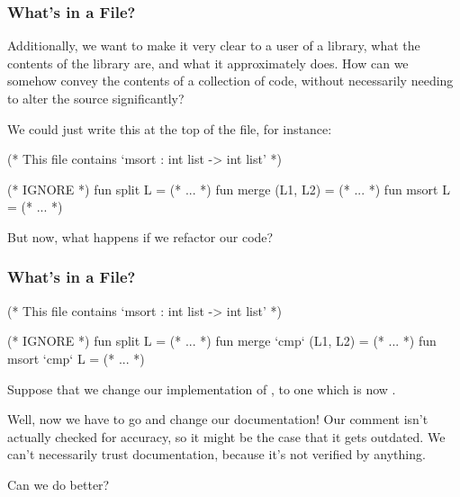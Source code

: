 \documentclass[aspectratio=169]{beamer}
\begin{document}
\begin{frame}[fragile]
  \frametitle{What's in a File?}

  Additionally, we want to make it very clear to a user of a library, what the
  contents of the library are, and what it approximately does. How can we somehow
  convey the contents of a collection of code, without necessarily needing to alter
  the source significantly?

  \pause
  \vspace{\fill}

  We could just write this at the top of the file, for instance:

  \begin{codeblock}
    (* This file contains `msort : int list -> int list' *)

    (* IGNORE *)
    fun split L = (* ... *)
    fun merge (L1, L2) = (* ... *)
    fun msort L = (* ... *)
  \end{codeblock}

  \pause
  But now, what happens if we refactor our code?
\end{frame}

\begin{frame}[fragile]
  \frametitle{What's in a File?}

  \begin{codeblock}
    (* This file contains `msort : int list -> int list' *)

    (* IGNORE *)
    fun split L = (* ... *)
    fun merge `cmp` (L1, L2) = (* ... *)
    fun msort `cmp` L = (* ... *)
  \end{codeblock}

  Suppose that we change our implementation of , to one
  which is now .

  \pause
  \vspace{\fill}

  Well, now we have to go and change our documentation! Our comment
  isn't actually checked for accuracy, so it might be the case that it
  gets outdated. We can't necessarily trust documentation, because it's
  not verified by anything.

  Can we do better?
\end{frame}
\end{document}
